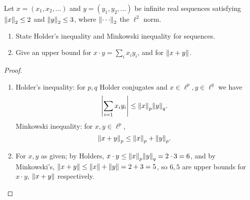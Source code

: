 \begin{question}
    Let $x = (x_1, x_2, \dots)$ and $y = (y_1, y_2, \dots)$ be infinite real sequences satisfying $\norm{x}_2 \leq 2$ and $\norm{y}_2 \leq 3$, where $\norm{\cdots}_2$ the $\ell^2$ norm.
    \begin{enumerate}[label=(\alph*)]
        \item State Holder's inequality and Minkowski inequality for sequences.
        \item Give an upper bound for $x \cdot y = \sum_{i} x_i y_i$, and for $\norm{x + y}$.
    \end{enumerate}
    \begin{proof}
        \begin{enumerate}[label=(\alph*)]
            \item Holder's inequality: for $p, q$ Holder conjugates and $x \in \ell^p, y \in \ell^q$ we have \[
           \abs{ \sum_{i=1} x_i y_i} \leq \norm{x}_p \norm{y}_q.
            \]
            Minkowski inequality: for $x, y \in \ell^p$, \[
            \norm{x + y}_p \leq \norm{x}_p + \norm{y}_p.    
            \]
            \item For $x, y$ as given; by Holders, $x \cdot y \leq \norm{x}_p \norm{y}_q = 2 \cdot 3 = 6$, and by Minkowski's, $\norm{x + y} \leq \norm{x} + \norm{y} = 2 + 3 = 5$, so $6, 5$ are upper bounds for $x \cdot y$, $\norm{x + y}$ respectively.
        \end{enumerate}
    \end{proof}
\end{question}


